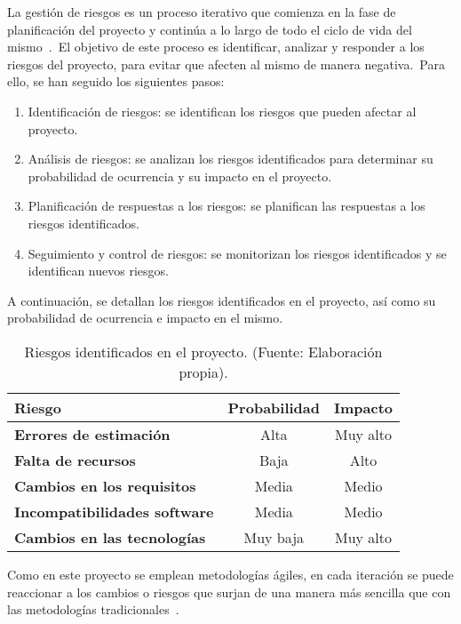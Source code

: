 
La gestión de riesgos es un proceso iterativo que comienza en la fase de planificación del proyecto y continúa a lo
largo de todo el ciclo de vida del mismo~\cite{riesgos_agile}.\ El objetivo de este proceso es identificar, analizar
y responder a los riesgos del proyecto, para evitar que afecten al mismo de manera negativa.\ Para ello, se han seguido
los siguientes pasos:

\begin{enumerate}
	\item Identificación de riesgos: se identifican los riesgos que pueden afectar al proyecto.
	\item Análisis de riesgos: se analizan los riesgos identificados para determinar su probabilidad de ocurrencia y su
	impacto en el proyecto.
	\item Planificación de respuestas a los riesgos: se planifican las respuestas a los riesgos identificados.
	\item Seguimiento y control de riesgos: se monitorizan los riesgos identificados y se identifican nuevos riesgos.
\end{enumerate}
\label{itm:riesgos_pasos}

A continuación, se detallan los riesgos identificados en el proyecto, así como su probabilidad de ocurrencia e impacto
en el mismo.

\begin{table}[H]
	\centering
	\caption{Riesgos identificados en el proyecto. (Fuente: Elaboración propia).}
	\begin{tabular}{lcc}
		\toprule
		\textbf{Riesgo}                    & \textbf{Probabilidad} & \textbf{Impacto} \\
		\midrule
		\textbf{Errores de estimación}       & Alta                  & Muy alto         \\
		\textbf{Falta de recursos}           & Baja                  & Alto             \\
		\textbf{Cambios en los requisitos}   & Media                 & Medio            \\
		\textbf{Incompatibilidades software} & Media                 & Medio            \\
		\textbf{Cambios en las tecnologías}  & Muy baja              & Muy alto         \\
		\bottomrule
	\end{tabular}
	\label{tab:riesgos_identificados}
\end{table}

Como en este proyecto se emplean metodologías ágiles, en cada iteración se puede reaccionar a los cambios o riesgos
que surjan de una manera más sencilla que con las metodologías tradicionales~\cite{Lagestion42:online}.
